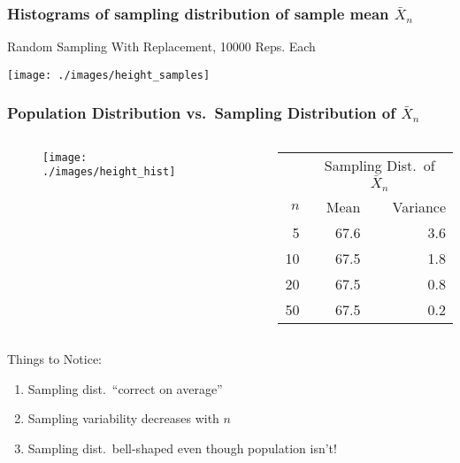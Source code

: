 %
\begin{frame}
\frametitle{Histograms of sampling distribution of sample mean $\bar{X}_n$}
\alert{Random Sampling With Replacement, 10000 Reps. Each}
\begin{center}
\texttt{[image: ./images/height\_samples]}
\end{center}
\end{frame}
\begin{frame}
\frametitle{Population Distribution vs.\ Sampling Distribution of $\bar{X}_n$}

\begin{columns} 
\begin{column}[c]{6cm} 

\begin{figure}
\centering
\texttt{[image: ./images/height\_hist]}
\end{figure}
\end{column} 
\begin{column}[c]{6cm} 

 \small
\begin{table}
\begin{tabular}{|rrr|}
\hline
&\multicolumn{2}{c|}{Sampling Dist.\ of $\bar{X}_n$}\\
$n$&Mean&Variance\\
\hline
5&67.6&3.6\\
10&67.5&1.8\\
20&67.5&0.8\\
50&67.5&0.2\\
\hline
\end{tabular}
\end{table}

\end{column} 
\end{columns} 
\begin{alertblock}{Things to Notice:}
\begin{enumerate}
	\item Sampling dist.\ ``correct on average'' 
	\item Sampling variability decreases with $n$
  \item Sampling dist.\ bell-shaped even though population isn't!
\end{enumerate}
\end{alertblock}
\end{frame}

